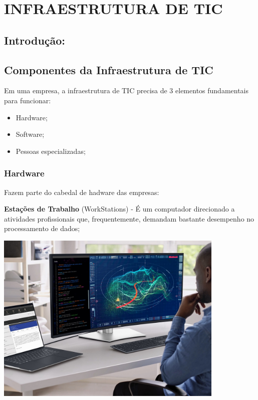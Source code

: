 \documentclass[
]{book}
\begin{document}
\chapter{INFRAESTRUTURA DE TIC}\label{infraestrutura-de-tic}

\section{Introdução:}\label{introduuxe7uxe3o-1}

\section{Componentes da Infraestrutura de TIC}\label{componentes-da-infraestrutura-de-tic}

Em uma empresa, a infraestrutura de TIC precisa de 3 elementos fundamentais para funcionar:

\begin{itemize}
\item
  Hardware;
\item
  Software;
\item
  Pessoas especializadas;
\end{itemize}

\subsection{Hardware}\label{hardware}

Fazem parte do cabedal de hadware das empresas:

\textbf{Estações de Trabalho} (WorkStations) - É um computador direcionado a atividades profissionais que, frequentemente, demandam bastante desempenho no processamento de dados;

\includegraphics[width=4.3125in,height=\textheight]{images/InfraEstrutura/hardware/01-estacao_de_trabalho.jpg}
\end{document}
